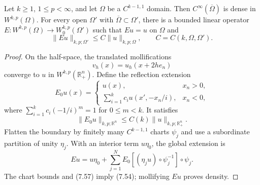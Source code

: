 \begin{theorem}
\label{gt:thm-sobolev-extension}
Let $k\geq1$, $1\leq p<\infty$, and let $\Omega$ be a
$C^{k-1,1}$ domain. Then $C^\infty(\overline\Omega)$ is dense in
$W^{k,p}(\Omega)$. For every open $\Omega'$ with
$\overline\Omega\subset\Omega'$, there is a
bounded linear operator
$E:W^{k,p}(\Omega)\to W_0^{k,p}(\Omega')$ such that $Eu=u$ on $\Omega$ and
\begin{equation}
\tag{7.54}
\|Eu\|_{k,p;\Omega'}\leq C\|u\|_{k,p;\Omega},
\qquad C=C(k,\Omega,\Omega').
\end{equation}
\end{theorem}
\begin{proof}
\sketch On the half-space, the translated mollifications
\begin{equation}
\tag{7.55}
v_h(x)=u_h(x+2he_n)
\end{equation}
converge to $u$ in $W^{k,p}(\mathbb R_+^n)$. Define the reflection extension
\begin{equation}
\tag{7.56}
E_0u(x)=
\begin{cases}
u(x),&x_n>0,\\
\displaystyle\sum_{i=1}^k c_i u(x',-x_n/i),&x_n<0,
\end{cases}
\end{equation}
where $\sum_{i=1}^kc_i(-1/i)^m=1$ for $0\leq m<k$. It satisfies
\begin{equation}
\tag{7.57}
\|E_0u\|_{k,p;\mathbb R^n}
\leq C(k)\|u\|_{k,p;\mathbb R_+^n}.
\end{equation}
Flatten the boundary by finitely many $C^{k-1,1}$ charts $\psi_j$ and use a
subordinate partition of unity $\eta_j$. With an interior term $u\eta_0$,
the global extension is
\begin{equation}
\tag{7.58}
Eu=u\eta_0+\sum_{j=1}^N
E_0[(\eta_ju)\circ\psi_j^{-1}]\circ\psi_j.
\end{equation}
The chart bounds and (7.57) imply (7.54); mollifying $Eu$ proves density.
\end{proof}

